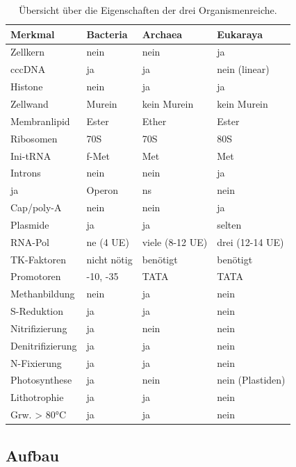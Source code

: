 	\begin{table}[h!]
	\begin{center}
	\begin{tabular}{l l l l} 
	\toprule
	Merkmal		&	Bacteria		&	 Archaea				&	 Eukaraya		\\
	\midrule
	Zellkern 	&	nein			&	 nein					&	 ja		\\
	cccDNA		&	ja				&	 ja					&	 nein (linear)			\\
	Histone		&	nein			&	 ja					&	 ja		\\
	Zellwand		&	Murein		&	 kein Murein		&	 kein Murein		\\
	Membranlipid&	Ester			&	 Ether				&	 Ester		\\
	\midrule
	Ribosomen	&	70S			&	 70S					&	 80S		\\
	Ini-tRNA		&	f-Met			&	 Met					&	 Met		\\
	Introns 		&	nein			&	 nein					&	 ja		\\
	ja				&	Operon		&	 ns					&	 nein		\\
	Cap/poly-A 	&	nein			&	 nein					&	 ja		\\
	Plasmide		&	ja				&	 ja					&	 selten		\\
	RNA-Pol			&	ne (4 UE)	&	 viele (8-12 UE)	&	drei (12-14 UE)	\\
	TK-Faktoren		&	nicht nötig	&	 benötigt			&	benötigt		\\
	Promotoren		&	-10, -35		&	 TATA					&	TATA		\\
	\midrule
	Methanbildung		&	nein			&	 ja					&	nein		\\
	S-Reduktion		&	ja				&	 ja					&	nein		\\
	Nitrifizierung	&	ja				&	 nein					&	nein		\\
	Denitrifizierung		&	ja				&	 ja					&	nein		\\
	N-Fixierung		&	ja				&	 ja					&	nein		\\
	Photosynthese		&	ja				&	 nein					&	nein (Plastiden)	\\
	Lithotrophie	&	ja				&	 ja					&	nein		\\
	Grw. > 80°C		&	ja				&	 ja					&	nein		\\
	\bottomrule
	\end{tabular}
	\caption{Übersicht über die Eigenschaften der drei Organismenreiche.}
	\label{tab:domaenenuberblick}
	\end{center}
	\end{table}

\subsection{Aufbau}

